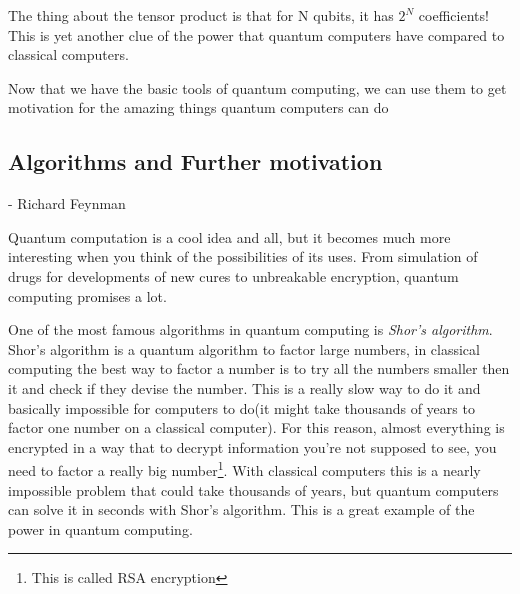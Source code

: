 \documentclass[english, a4paper, 12pt, twoside]{article}
\numberwithin{equation}{section} %
\begin{document}
The thing about the tensor product is that for N qubits, it has $2^N$ coefficients! This is yet another clue of the power that quantum computers have compared to classical computers. 

Now that we have the basic tools of quantum computing, we can use them to get motivation for the amazing things quantum computers can do

\subsection{Algorithms and Further motivation}
 \begin{quotation}
 \end{quotation}
\centerline{- Richard Feynman}
Quantum computation is a cool idea and all, but it becomes much more interesting when you think of the possibilities of its uses. From simulation of drugs for developments of new cures to unbreakable encryption, quantum computing promises a lot. 

One of the most famous algorithms in quantum computing is \textit{Shor's algorithm}. Shor's algorithm is a quantum algorithm to factor large numbers, in classical computing the best way to factor a number is to try all the numbers smaller then it and check if they devise the number. This is a really slow way to do it and basically impossible for computers to do(it might take thousands of years to factor one number on a classical computer). For this reason, almost everything is encrypted in a way that to decrypt information you're not supposed to see, you need to factor a really big number\footnote{This is called RSA encryption}. With classical computers this is a nearly impossible problem that could take thousands of years, but quantum computers can solve it in seconds with Shor's algorithm. This is a great example of the power in quantum computing.
\end{document}
